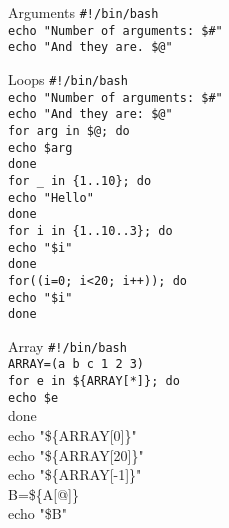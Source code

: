 \documentclass{beamer}
\let\tt\texttt
\begin{document}
\begin{frame}{Arguments}
        \tt{\#!/bin/bash}                       \\
        \tt{echo "Number of arguments: \$\#"}   \\
        \tt{echo "And they are. \$@"}           \\
\end{frame}

\begin{frame}{Loops}
        \tt{\#!/bin/bash}                       \\
        \tt{echo "Number of arguments: \$\#"}   \\
        \tt{echo "And they are: \$@"}           \\
        \tt{for arg in \$@; do}                 \\
        \quad \tt{echo \$arg}                   \\
        \tt{done}                               \\
        \tt{for \_ in \{1..10\}; do}            \\
        \quad \tt{echo "Hello"}                 \\
        \tt{done}                               \\
        \tt{for i in \{1..10..3\}; do}          \\
        \quad \tt{echo "\$i"}                   \\
        \tt{done}                               \\
        \tt{for((i=0; i<20; i++)); do}          \\
        \quad \tt{echo "\$i"}                   \\
        \tt{done}                               \\
\end{frame}

\begin{frame}{Array}
        \tt{\#!/bin/bash}                       \\
        \tt{ARRAY=(a b c 1 2 3)}                \\
        \tt{for e in \$\{ARRAY[*]\}; do}        \\
        \quad \tt{echo \$e}                     \\
        done                                    \\
        echo "\$\{ARRAY[0]\}"                   \\
        echo "\$\{ARRAY[20]\}"                  \\
        echo "\$\{ARRAY[-1]\}"                  \\
        B=\$\{A[@]\}                            \\
        echo "\$B"
\end{frame}
\end{document}
